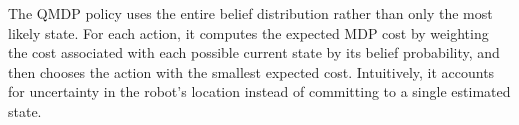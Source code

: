 The QMDP policy uses the entire belief distribution rather than only the most likely state. For each action, it computes the expected MDP cost by weighting the cost associated with each possible current state by its belief probability, and then chooses the action with the smallest expected cost. Intuitively, it accounts for uncertainty in the robot’s location instead of committing to a single estimated state.
